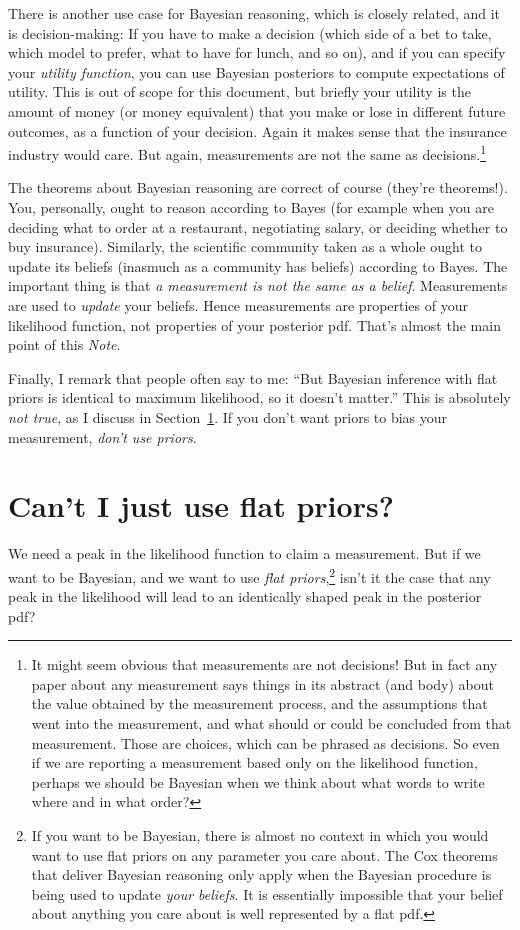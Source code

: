 \documentclass{article}
\newcommand{\documentname}{\textsl{Note}}
\newcommand{\sectionname}{Section}
\newcommand{\secref}[1]{\sectionname~\ref{#1}}
\begin{document}
There is another use case for Bayesian reasoning, which is closely related, and it is decision-making:
If you have to make a decision (which side of a bet to take, which model to prefer, what to have for lunch, and so on),
and if you can specify your \emph{utility function}, you can use Bayesian posteriors to compute expectations of utility.
This is out of scope for this document, but briefly your utility is the amount of money (or money equivalent) that you make or lose in different future outcomes, as a function of your decision.
Again it makes sense that the insurance industry would care.
But again, measurements are not the same as decisions.\footnote{%
It might seem obvious that measurements are not decisions!
But in fact any paper about any measurement says things in its abstract (and body) about the value obtained by the measurement process, and the assumptions that went into the measurement, and what should or could be concluded from that measurement.
Those are choices, which can be phrased as decisions.
So even if we are reporting a measurement based only on the likelihood function, perhaps we should be Bayesian when we think about what words to write where and in what order?}

The theorems about Bayesian reasoning are correct of course (they're theorems!).
You, personally, ought to reason according to Bayes (for example when you are deciding what to order at a restaurant, negotiating salary, or deciding whether to buy insurance).
Similarly, the scientific community taken as a whole ought to update its beliefs (inasmuch as a community has beliefs) according to Bayes.
The important thing is that \emph{a measurement is not the same as a belief}.
Measurements are used to \emph{update} your beliefs.
Hence measurements are properties of your likelihood function, not properties of your posterior pdf.
That's almost the main point of this \documentname.

Finally, I remark that people often say to me: ``But Bayesian inference with flat priors is identical to maximum likelihood, so it doesn't matter.''
This is absolutely \emph{not true}, as I discuss in \secref{sec:flat}.
If you don't want priors to bias your measurement, \emph{don't use priors}.

\section{Can't I just use flat priors?}\label{sec:flat}
We need a peak in the likelihood function to claim a measurement.
But if we want to be Bayesian, and we want to use \emph{flat priors},\footnote{%
If you want to be Bayesian, there is almost no context in which you would want to use flat priors on any parameter you care about.
The Cox theorems that deliver Bayesian reasoning only apply when the Bayesian procedure is being used to update \emph{your beliefs}.
It is essentially impossible that your belief about anything you care about is well represented by a flat pdf.}
isn't it the case that any peak in the likelihood will lead to an identically shaped peak in the posterior pdf?
\end{document}
